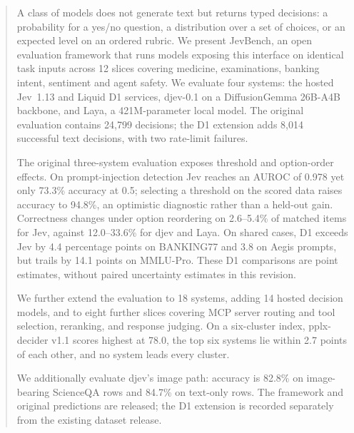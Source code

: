 \begin{abstract}
A class of models does not generate text but returns typed decisions: a probability for a yes/no question, a distribution over a set of choices, or an expected level on an ordered rubric. We present JevBench, an open evaluation framework that runs models exposing this interface on identical task inputs across 12 slices covering medicine, examinations, banking intent, sentiment and agent safety. We evaluate four systems: the hosted Jev~1.13 and Liquid D1 services, djev-0.1 on a DiffusionGemma 26B-A4B backbone, and Laya, a 421M-parameter local model. The original evaluation contains 24{,}799 decisions; the D1 extension adds 8{,}014 successful text decisions, with two rate-limit failures.

The original three-system evaluation exposes threshold and option-order effects. On prompt-injection detection Jev reaches an AUROC of 0.978 yet only 73.3\% accuracy at 0.5; selecting a threshold on the scored data raises accuracy to 94.8\%, an optimistic diagnostic rather than a held-out gain. Correctness changes under option reordering on 2.6--5.4\% of matched items for Jev, against 12.0--33.6\% for djev and Laya. On shared cases, D1 exceeds Jev by 4.4 percentage points on BANKING77 and 3.8 on Aegis prompts, but trails by 14.1 points on MMLU-Pro. These D1 comparisons are point estimates, without paired uncertainty estimates in this revision.

We further extend the evaluation to 18 systems, adding 14 hosted decision models, and to eight further slices covering MCP server routing and tool selection, reranking, and response judging. On a six-cluster index, pplx-decider v1.1 scores highest at 78.0, the top six systems lie within 2.7 points of each other, and no system leads every cluster.

We additionally evaluate djev's image path: accuracy is 82.8\% on image-bearing ScienceQA rows and 84.7\% on text-only rows. The framework and original predictions are released; the D1 extension is recorded separately from the existing dataset release.
\end{abstract}
